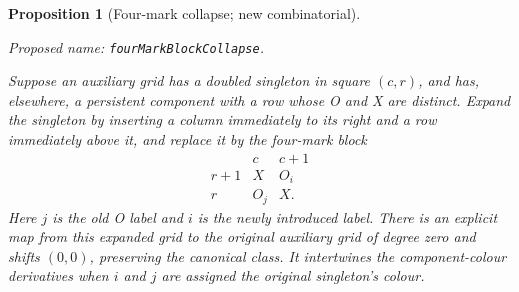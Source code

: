 \documentclass[11pt,a4paper]{article}
\newtheorem{proposition}[theorem]{Proposition}
\theoremstyle{remark}
\newcommand{\formalname}[1]{\leavevmode\par\noindent\textnormal{\small Proposed name: \texttt{#1}.}\par\smallskip}
\begin{document}
\begin{proposition}[Four-mark collapse; new combinatorial]\label{prop:four-mark-collapse}
\formalname{fourMarkBlockCollapse}
Suppose an auxiliary grid has a doubled singleton in square $(c,r)$,
and has, elsewhere, a persistent component with a row whose O and X
are distinct.  Expand the singleton by inserting a column immediately
to its right and a row immediately above it, and replace it by the
four-mark block
\[
 \begin{array}{c|cc}
 &c&c+1\\ \hline
 r+1&X&O_i\\
 r&O_j&X.
 \end{array}
\]
Here $j$ is the old O label and $i$ is the newly introduced label.
There is an explicit map from this expanded grid to the original
auxiliary grid of degree zero and shifts $(0,0)$, preserving the
canonical class.  It intertwines the component-colour derivatives when
$i$ and $j$ are assigned the original singleton's colour.
\end{proposition}
\end{document}
